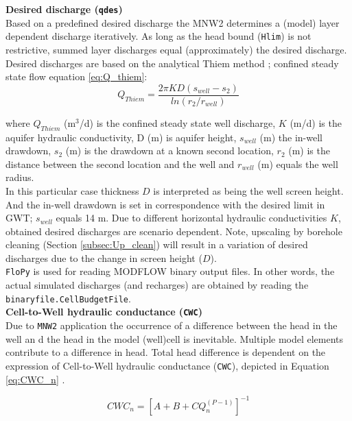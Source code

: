 \textbf{Desired discharge (\texttt{qdes})} \\
Based on a predefined desired discharge the MNW2 determines a (model) layer dependent discharge iteratively. As long as the head bound (\texttt{Hlim}) is not restrictive, summed layer discharges equal (approximately) the desired discharge. Desired discharges are based on the analytical Thiem method \citep{Kruseman2000}; confined steady state flow equation \ref{eq:Q_thiem}: \\

\begin{equation}
 Q_{Thiem} = \frac{2\pi KD (s_{well}- s_{2})}{ln(r_{2}/r_{well})}
\label{eq:Q_thiem}
\end{equation}  

where $Q_{Thiem}$ (m$^3$/d) is the confined steady state well discharge, $K$ (m/d) is the aquifer hydraulic conductivity, D (m) is aquifer height, $s_{well}$ (m) the in-well drawdown, $s_{2}$ (m) is the drawdown at a known second location, $r_{2}$ (m) is the distance between the second location and the well and $r_{well}$ (m) equals the well radius. \\

In this particular case thickness $D$ is interpreted as being the well screen height. And the in-well drawdown is set in correspondence with the desired limit in GWT; $s_{well}$ equals 14 m. Due to different horizontal hydraulic conductivities $K$, obtained desired discharges are scenario dependent. Note, upscaling by borehole cleaning (Section \ref{subsec:Up_clean}) will result in a variation of desired discharges due to the change in screen height ($D$). \\

\texttt{FloPy} is used for reading MODFLOW binary output files. In other words, the actual simulated discharges (and recharges) are obtained by reading the \texttt{binaryfile.CellBudgetFile}. \\

\textbf{Cell-to-Well hydraulic conductance (\texttt{CWC})} \\
Due to \texttt{MNW2} application the occurrence of a difference between the head in the well an d the head in the model (well)cell is inevitable. Multiple model elements contribute to a difference in head. Total head difference is dependent on the expression of Cell-to-Well hydraulic conductance (\texttt{CWC}), depicted in Equation \ref{eq:CWC_n} \citep{LeonardF.KonikowGeorgeZ.HornbergerKeithJ.Halford2009}. 

\begin{equation}
 CWC_n = [A + B + CQ_{n}^{(P-1)}]^{-1}
\label{eq:CWC_n}
\end{equation}  

